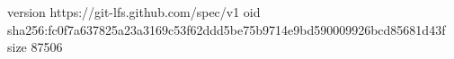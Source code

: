 version https://git-lfs.github.com/spec/v1
oid sha256:fc0f7a637825a23a3169c53f62ddd5be75b9714e9bd590009926bcd85681d43f
size 87506

